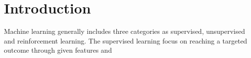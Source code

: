 \section{Introduction}

Machine learning generally includes three categories as supervised, unsupervised and reinforcement learning. The supervised learning focus on reaching a targeted outcome through given features and
